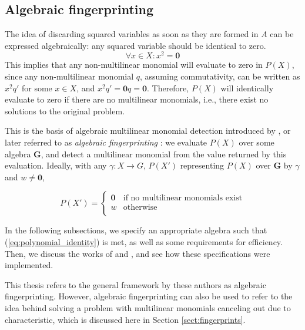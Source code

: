 \subsection{Algebraic fingerprinting}
\label{sect:algebraic_fingerprinting}

The idea of discarding squared variables as soon as they are formed in $A$ 
can be expressed algebraically: any squared variable should be identical to
zero. 
\begin{equation}
  \label{eq:squared_to_zero}
\forall x \in X: x^2 = \mathbf{0}
\end{equation}
This implies that any non-multilinear monomial will evaluate to zero in $P(X)$, since 
any non-multilinear monomial $q$, assuming commutativity, can be written as $x^2q'$ 
for some $x \in X$, and $x^2q' = \mathbf{0}q = \mathbf{0}$. 
Therefore, $P(X)$ will identically evaluate to zero if there are no multilinear monomials, 
i.e., there exist no solutions to the original problem.

This is the basis of algebraic multilinear monomial detection introduced by 
\citeauthor{Koutis08} \cite{Koutis08}, or later referred to as \emph{algebraic fingerprinting} \cite{KouWil15}: 
we evaluate $P(X)$ over some algebra $\mathbf{G}$, and detect a multilinear monomial from 
the value returned by this evaluation. Ideally, with any $\gamma \colon X \to G$, $P(X')$ representing 
$P(X)$ over $\mathbf{G}$ by $\gamma$ and $w \neq \mathbf{0}$, 

\begin{equation}
  \label{eq:polynomial_identity}
  P(X') =
    \begin{cases}
      \mathbf{0} & \text{if no multilinear monomials exist}\\
      w & \text{otherwise}\\
    \end{cases}       
\end{equation}

In the following subsections, we specify an appropriate algebra such that 
(\ref{eq:polynomial_identity}) is met, as well as some requirements for efficiency. 
Then, we discuss the works of \citeauthor{Koutis08} and \citeauthor{Williams09} \cite{Koutis08, Williams09}, 
and see how these specifications were implemented.

This thesis refers to the general framework \cite{KouWil09, KouWil15} by these 
authors as algebraic fingerprinting. However, algebraic fingerprinting can also 
be used to refer to the idea behind solving a problem 
with multilinear monomials canceling out due to characteristic, 
which is discussed here in Section \ref{sect:fingerprints}.

